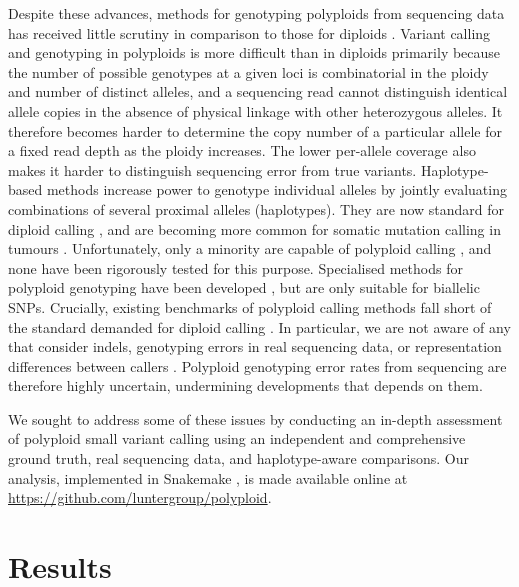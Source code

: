 \documentclass[notitlepage, twocolumn, 10pt]{article}
\begin{document}
Despite these advances, methods for genotyping polyploids from sequencing data has received little scrutiny in comparison to those for diploids \cite{RN677, RN651, RN605, RN675}. Variant calling and genotyping in polyploids is more difficult than in diploids primarily because the number of possible genotypes at a given loci is combinatorial in the ploidy and number of distinct alleles, and a sequencing read cannot distinguish identical allele copies in the absence of physical linkage with other heterozygous alleles. It therefore becomes harder to determine the copy number of a particular allele for a fixed read depth as the ploidy increases. The lower per-allele coverage also makes it harder to distinguish sequencing error from true variants. Haplotype-based methods increase  power to genotype individual alleles by jointly evaluating combinations of several proximal alleles (haplotypes). They are now standard for diploid calling \cite{RN663, RN598, RN538, RN604, RN619, RN5}, and are becoming more common for somatic mutation calling in tumours \cite{RN663}. Unfortunately, only a minority are capable of polyploid calling \cite{RN663, RN598, RN538}, and none have been rigorously tested for this purpose. Specialised methods for polyploid genotyping have been developed \cite{RN666, RN662, RN674}, but are only suitable for biallelic SNPs. Crucially, existing benchmarks of polyploid calling methods fall short of the standard demanded for diploid calling \cite{RN678, RN655, RN656, RN675}. In particular, we are not aware of any that consider indels, genotyping errors in real sequencing data, or representation differences between callers \cite{RN675}. Polyploid genotyping error rates from sequencing are therefore highly uncertain, undermining developments that depends on them.

We sought to address some of these issues by conducting an in-depth assessment of polyploid small variant calling using an independent and comprehensive ground truth, real sequencing data, and haplotype-aware comparisons. Our analysis, implemented in Snakemake \cite{RN756}, is made available online at \url{https://github.com/luntergroup/polyploid}.

\section*{Results}
\end{document}

